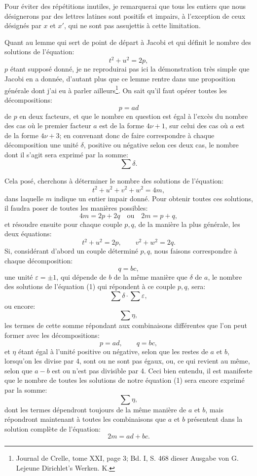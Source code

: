\documentclass[11pt]{article}
\begin{document}
Pour éviter des répétitions inutiles, je remarquerai que tous les entiers que nous désignerons par des lettres latines sont positifs et impairs, à l'exception de ceux désignés par \(x\) et \(x'\), qui ne sont pas assujettis à cette limitation.

Quant au lemme qui sert de point de départ à Jacobi et qui définit le nombre des solutions de l'équation:
\[
t^2+u^2=2p,
\]
\(p\) étant supposé donné, je ne reproduirai pas ici la démonstration très simple que Jacobi en a donnée, d'autant plus que ce lemme rentre dans une proposition générale dont j'ai eu à parler ailleurs\footnote{Journal de Crelle, tome XXI, page 3; Bd. I, S. 468 dieser Ausgabe von G. Lejeune Dirichlet's Werken. K.}. On sait qu'il faut opérer toutes les décompositions:
\[
p=ad
\]
de \(p\) en deux facteurs, et que le nombre en question est égal à l'excès du nombre des cas où le premier facteur \(a\) est de la forme \(4\nu+1\), sur celui des cas où \(a\) est de la forme \(4\nu+3\); en convenant donc de faire correspondre à chaque décomposition une unité \(\delta\), positive ou négative selon ces deux cas, le nombre dont il s'agit sera exprimé par la somme:
\[
\sum \delta.
\]

Cela posé, cherchons à déterminer le nombre des solutions de l'équation:
\[
\tag{1} t^2+u^2+v^2+w^2=4m,
\]
dans laquelle \(m\) indique un entier impair donné. Pour obtenir toutes ces solutions, il faudra poser de toutes les manières possibles:
\[
4m=2p+2q\quad\text{ou}\quad 2m=p+q,
\]
et résoudre ensuite pour chaque couple \(p,q\), de la manière la plus générale, les deux équations:
\[
t^2+u^2=2p,\qquad v^2+w^2=2q.
\]
Si, considérant d'abord un couple déterminé \(p,q\), nous faisons correspondre à chaque décomposition:
\[
q=bc,
\]
une unité \(\varepsilon=\pm1\), qui dépende de \(b\) de la même manière que \(\delta\) de \(a\), le nombre des solutions de l'équation (1) qui répondent à ce couple \(p,q\), sera:
\[
\sum\delta\cdot\sum\varepsilon,
\]
ou encore:
\[
\sum\eta,
\]
les termes de cette somme répondant aux combinaisons différentes que l'on peut former avec les décompositions:
\[
p=ad,\qquad q=bc,
\]
et \(\eta\) étant égal à l'unité positive ou négative, selon que les restes de \(a\) et \(b\), lorsqu'on les divise par 4, sont ou ne sont pas égaux, ou, ce qui revient au même, selon que \(a-b\) est ou n'est pas divisible par 4. Ceci bien entendu, il est manifeste que le nombre de toutes les solutions de notre équation (1) sera encore exprimé par la somme:
\[
\sum\eta,
\]
dont les termes dépendront toujours de la même manière de \(a\) et \(b\), mais répondront maintenant à toutes les combinaisons que \(a\) et \(b\) présentent dans la solution complète de l'équation:
\[
\tag{2} 2m=ad+bc.
\]
\end{document}
